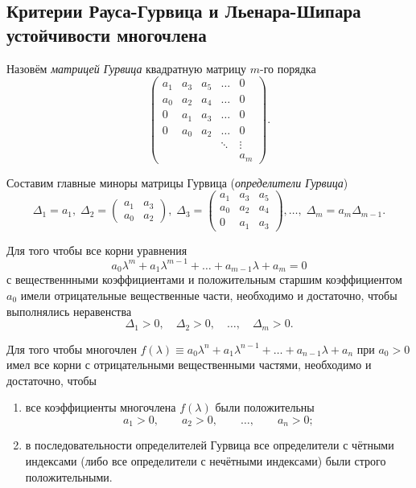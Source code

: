 \documentclass[a4paper]{article}
\begin{document}
\subsection{Критерии Рауса-Гурвица и Льенара-Шипара устойчивости многочлена}
\begin{dfn}
	 Назовём \emph{матрицей Гурвица} квадратную  матрицу $m$-го порядка
	 \[
		 \begin{pmatrix} a_1 & a_3 & a_5 & \ldots & 0\\
		 a_0 & a_2 & a_4 & \ldots & 0 \\
	 0 & a_1 & a_3 & \ldots & 0\\
 0 & a_0 & a_2 & \ldots & 0 \\
  & & & \ddots & \vdots\\
  & & & & a_m
 \end{pmatrix} 
	  .\] 
\end{dfn}
Составим главные миноры  матрицы Гурвица (\emph{определители Гурвица})
\[
	\Delta_1=a_1, \; \Delta_2 = \begin{pmatrix} a_1 & a_3 \\ a_0 & a_2 \end{pmatrix},
	\; \Delta_3= \begin{pmatrix} a_1 & a_3 & a_5 \\ a_0 & a_2 & a_4 \\
	0 & a_1 & a_3\end{pmatrix} ,\ldots,\; \Delta_m =a_m \Delta_{m-1}
.\] 
\begin{thm}
	Для того чтобы все корни уравнения
	\[
	a_0 \lambda^m+a_1 \lambda^{m-1}+\ldots+a_{m-1}\lambda+a_m=0
	\]
	с вещественнными коэффициентами и положительным старшим  коэффициентом
	$a_0$ имели отрицательные вещественные   части, необходимо и достаточно,
	чтобы выполнялись неравенства
	\[
	\Delta_1>0,\quad\Delta_2>0,\quad \ldots, \quad \Delta_m >0
	.\] 
\end{thm}
\begin{thm}
	 Для того чтобы многочлен
	$f(\lambda)\equiv a_0 \lambda^n+a_1 
	\lambda^{n-1}+\ldots+a_{n-1}\lambda+a_n$ при $a_0>0$ имел все корни
	с отрицательными вещественными частями, необходимо и достаточно, чтобы
	\begin{enumerate}
		\item все коэффициенты многочлена $f(\lambda)$ были
			положительны
			 \[
			a_1>0,\qquad a_2>0,\qquad \ldots, \qquad a_n>0;
			\]
		\item %
			в последовательности определителей Гурвица все
			определители с чётными индексами (либо все определители
			с нечётными индексами) были строго положительными.
	\end{enumerate}
\end{thm}
\end{document}
